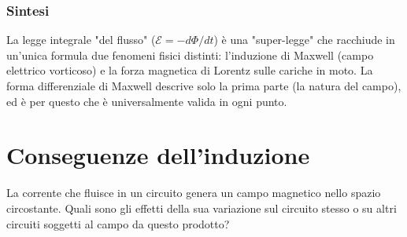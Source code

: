 \documentclass[a4paper,11pt]{report}
\begin{document}
\begin{approfondimento}[colback=white, colframe=blue!60, no shadow, title=Validità generale della legge di Faraday-Neumann-Lenz]
\subsubsection{Sintesi}
    La legge integrale "del flusso" ($\mathcal{E} = -d\Phi/dt$) è una "super-legge" che racchiude in un'unica formula due fenomeni fisici distinti: l'induzione di Maxwell (campo elettrico vorticoso) e la forza magnetica di Lorentz sulle cariche in moto.
    La forma differenziale di Maxwell descrive solo la prima parte (la natura del campo), ed è per questo che è universalmente valida in ogni punto.
\end{approfondimento}

\section{Conseguenze dell'induzione}
La corrente che fluisce in un circuito genera un campo magnetico nello spazio circostante. Quali sono gli effetti della sua variazione sul circuito stesso o su altri circuiti soggetti al campo da questo prodotto? 
\end{document}
